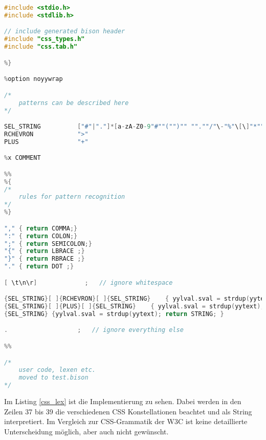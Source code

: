 \begin{lstlisting}[label=css_lex,language=C, caption=Beschreibung der CSS Grammatik in Lex]
%{
#include <stdio.h>
#include <stdlib.h>

// include generated bison header
#include "css_types.h"
#include "css.tab.h"

%}

%option noyywrap

/* 
    patterns can be described here
*/

SEL_STRING			["#"|"."]*[a-zA-Z0-9"#""("")"" "".""/"\-"%"\[\]"*""_""=""!""@""'""?"]+
RCHEVRON			">"
PLUS				"+"

%x COMMENT

%%
%{
/*
    rules for pattern recognition
*/
%}

"," { return COMMA;}
":" { return COLON;}
";" { return SEMICOLON;}
"{" { return LBRACE ;}
"}" { return RBRACE ;}
"." { return DOT ;}

[ \t\n\r]             ;   // ignore whitespace

{SEL_STRING}[ ]{RCHEVRON}[ ]{SEL_STRING}	{ yylval.sval = strdup(yytext); return STRING; }
{SEL_STRING}[ ]{PLUS}[ ]{SEL_STRING}	{ yylval.sval = strdup(yytext); return STRING; }
{SEL_STRING} {yylval.sval = strdup(yytext); return STRING; }

.                   ;   // ignore everything else

%%

/*
    user code, lexen etc.
    moved to test.bison
*/
\end{lstlisting} 
Im Listing \ref{css_lex} ist die Implementierung zu sehen. Dabei werden in den Zeilen 37 bis 39 die verschiedenen CSS Konstellationen beachtet und als String interpretiert. Im Vergleich zur CSS-Grammatik der W3C ist keine detaillierte Unterscheidung möglich, aber auch nicht gewünscht.

